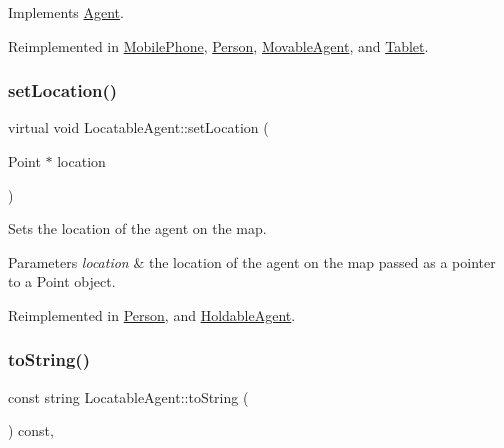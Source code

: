 Implements \mbox{\hyperlink{class_agent_afe6c72d91baf9ee4fe77ea1ed7fef3ba}{Agent}}.



Reimplemented in \mbox{\hyperlink{class_mobile_phone_a1eeac3141baafa75ebcf26fc3a0e4068}{Mobile\+Phone}}, \mbox{\hyperlink{class_person_aa2a6f8d7f1d94045a03ca578f2ed272c}{Person}}, \mbox{\hyperlink{class_movable_agent_abcc1218876c39c996f2cb1eba2b96379}{Movable\+Agent}}, and \mbox{\hyperlink{class_tablet_adc7196aaee1e9714236b7cd8825d5826}{Tablet}}.

\mbox{\label{class_locatable_agent_a754b237c404b77714fedd397f214bc02}} 
\subsubsection{\texorpdfstring{setLocation()}{setLocation()}}
{\footnotesize\ttfamily virtual void Locatable\+Agent\+::set\+Location (\begin{DoxyParamCaption}\item[{Point $\ast$}]{location }\end{DoxyParamCaption})\hspace{0.3cm}{\ttfamily [virtual]}}

Sets the location of the agent on the map. 
\begin{DoxyParams}{Parameters}
{\em location} & the location of the agent on the map passed as a pointer to a Point object. \\
\hline
\end{DoxyParams}


Reimplemented in \mbox{\hyperlink{class_person_a05f4ac2107d59e03f0f336eda08aa358}{Person}}, and \mbox{\hyperlink{class_holdable_agent_aec98d2fe325b48d9a84ad3dad44700e0}{Holdable\+Agent}}.

\mbox{\label{class_locatable_agent_a88674f4c8ab9b1b2f3986b226bf4244f}} 
\subsubsection{\texorpdfstring{toString()}{toString()}}
{\footnotesize\ttfamily const string Locatable\+Agent\+::to\+String (\begin{DoxyParamCaption}{ }\end{DoxyParamCaption}) const\hspace{0.3cm}{\ttfamily [override]}, {\ttfamily [virtual]}}

